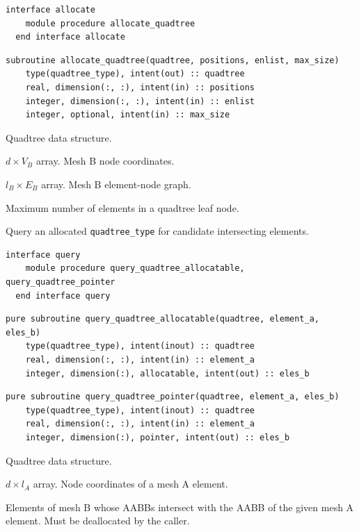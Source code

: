 \documentclass{article}
\begin{document}
\begin{lstlisting}[language=FORTRAN]
  interface allocate
    module procedure allocate_quadtree
  end interface allocate
\end{lstlisting}
  
\begin{lstlisting}[language=FORTRAN]
  subroutine allocate_quadtree(quadtree, positions, enlist, max_size)
    type(quadtree_type), intent(out) :: quadtree
    real, dimension(:, :), intent(in) :: positions
    integer, dimension(:, :), intent(in) :: enlist
    integer, optional, intent(in) :: max_size 
\end{lstlisting}

\begin{description}[font=\ttfamily\bfseries,leftmargin=2.2\parindent,labelindent=1.7\parindent,noitemsep]
  \item[quadtree] Quadtree data structure.
  \item[positions] $d \times V_B$ array. Mesh B node coordinates.
  \item[enlist] $l_B \times E_B$ array. Mesh B element-node graph.
  \item[max\_size] Maximum number of elements in a quadtree leaf node.
\end{description}

\noindent Query an allocated \verb+quadtree_type+ for candidate intersecting
elements.
  
\begin{lstlisting}[language=FORTRAN]
  interface query
    module procedure query_quadtree_allocatable, query_quadtree_pointer
  end interface query
\end{lstlisting}
    
\begin{lstlisting}[language=FORTRAN]
  pure subroutine query_quadtree_allocatable(quadtree, element_a, eles_b)
    type(quadtree_type), intent(inout) :: quadtree
    real, dimension(:, :), intent(in) :: element_a
    integer, dimension(:), allocatable, intent(out) :: eles_b
\end{lstlisting}
  
\begin{lstlisting}[language=FORTRAN]
  pure subroutine query_quadtree_pointer(quadtree, element_a, eles_b)
    type(quadtree_type), intent(inout) :: quadtree
    real, dimension(:, :), intent(in) :: element_a
    integer, dimension(:), pointer, intent(out) :: eles_b
\end{lstlisting}

\begin{description}[font=\ttfamily\bfseries,leftmargin=2.2\parindent,labelindent=1.7\parindent,noitemsep]
  \item[quadtree] Quadtree data structure.
  \item[element\_a] $d \times l_A$ array. Node coordinates of a mesh A element.
  \item[eles\_b] Elements of mesh B whose AABBs intersect with the AABB of the
    given mesh A element. Must be deallocated by the caller.
\end{description}
\end{document}
